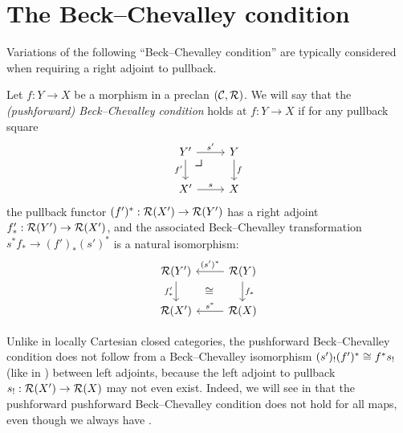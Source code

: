 \section{The Beck--Chevalley condition}

Variations of the following ``Beck--Chevalley condition''
are typically considered when requiring a right adjoint to pullback.

\begin{definition} \label{def:beck-chevalley}
  Let $f : Y \to X$ be a morphism in a preclan $(\mathcal{C},\mathcal{R})$.
  We will say that the \emph{(pushforward) Beck--Chevalley condition}
  holds at $f : Y \to X$ if for any pullback square
   \[ \begin{tikzcd}
        Y' \ar[r, "s'"] \ar[d, "f'"'] \pbcorner & Y \ar[d, "f"] \\
        X' \ar[r, "s"] & X
      \end{tikzcd} \]
    the pullback functor
    $(f')^* : \mathcal{R}(X') \to \mathcal{R}(Y')$
    has a right adjoint $f'_* : \mathcal{R}(Y') \to \mathcal{R}(X')$,
    and the associated Beck--Chevalley transformation
    $s^* f_* \to (f')_* (s')^*$
    is a natural isomorphism:
    \[
      \begin{tikzcd}
        \RR(Y') \ar[d, "f'_*"'] \ar[dr, phantom, "\cong"]  &
        \RR(Y) \ar[l, "(s')^*"'] \ar[d, "f_*"] \\
        \RR(X') & \RR(X) \ar[l, "s^*"']
      \end{tikzcd}
    \]
\end{definition}

Unlike in locally Cartesian closed categories,
the pushforward Beck--Chevalley condition does not follow
from a Beck--Chevalley isomorphism $(s')_! (f')^* \cong f^* s_!$
(like in ) between left adjoints,
because the left adjoint to pullback
$s_! : \mathcal{R}(X') \to \mathcal{R}(X)$ may not even exist.
Indeed, we will see in  that the
pushforward pushforward Beck--Chevalley condition
does not hold for all maps, 
even though we always have .


